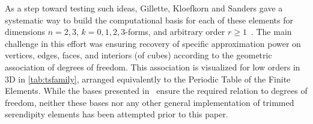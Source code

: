 \documentclass[format=acmsmall,screen,timestamp=false,a4paper]{acmart}
\newcommand\josh[1]{\textbf{\textcolor[rgb]{0,.5,1}{[Josh: #1]}}}
\newcommand{\calS}{\mathcal{S}}
\begin{document}
  

  

	As a step toward testing such ideas, Gillette, Kloefkorn and Sanders gave a systematic way to build the computational basis for each of these elements for dimensions $n = 2, 3$, $k=0, 1, 2, 3$-forms, and arbitrary order $r \geq 1$~\cite{gillette2019computational}.
	The main challenge in this effort was ensuring recovery of specific approximation power on vertices, edges, faces, and interiors (of cubes) according to the geometric association of degrees of freedom.  
	This association is visualized for low orders in 3D in \cref{tab:tsfamily}, arranged equivalently to the Periodic Table of the Finite Elements.
	While the bases presented in~\cite{gillette2019computational} ensure the required relation to degrees of freedom, neither these bases nor any other general implementation of trimmed serendipity elements has been attempted prior to this paper.

	
	
  
\end{document}
